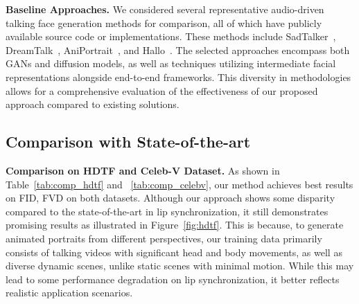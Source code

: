 \noindent\textbf{Baseline Approaches.}
We considered several representative audio-driven talking face generation methods for comparison, all of which have publicly available source code or implementations. These methods include SadTalker~\cite{zhang2022sadtalker}, DreamTalk~\cite{ma2023dreamtalk}, AniPortrait~\cite{wei2024aniportrait}, and Hallo~\cite{xu2024hallo,cui2024hallo2}. 
The selected approaches encompass both GANs and diffusion models, as well as techniques utilizing intermediate facial representations alongside end-to-end frameworks. 
This diversity in methodologies allows for a comprehensive evaluation of the effectiveness of our proposed approach compared to existing solutions.







\subsection{Comparison with State-of-the-art}

\noindent\textbf{Comparison on HDTF and Celeb-V Dataset.}
{As shown in Table~\ref{tab:comp_hdtf} and ~\ref{tab:comp_celebv}, our method achieves best results on FID, FVD on both datasets. Although our approach shows some disparity compared to the state-of-the-art in lip synchronization, it still demonstrates promising results as illustrated in Figure~\ref{fig:hdtf}. This is because, to generate animated portraits from different perspectives, our training data primarily consists of talking videos with significant head and body movements, as well as diverse dynamic scenes, unlike static scenes with minimal motion. While this may lead to some performance degradation on lip synchronization, it better reflects realistic application scenarios. }

